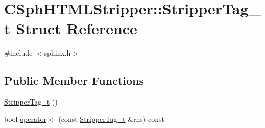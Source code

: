 \hypertarget{structCSphHTMLStripper_1_1StripperTag__t}{\section{C\-Sph\-H\-T\-M\-L\-Stripper\-:\-:Stripper\-Tag\-\_\-t Struct Reference}
\label{structCSphHTMLStripper_1_1StripperTag__t}
}


{\ttfamily \#include $<$sphinx.\-h$>$}

\subsection*{Public Member Functions}
\begin{DoxyCompactItemize}
\item 
\hyperlink{structCSphHTMLStripper_1_1StripperTag__t_a08abc94d56317954af14141dcef440ac}{Stripper\-Tag\-\_\-t} ()
\item 
bool \hyperlink{structCSphHTMLStripper_1_1StripperTag__t_a6421d8a45e9a4fd8f293b8dbe805b0e1}{operator$<$} (const \hyperlink{structCSphHTMLStripper_1_1StripperTag__t}{Stripper\-Tag\-\_\-t} \&rhs) const 
\end{DoxyCompactItemize}
